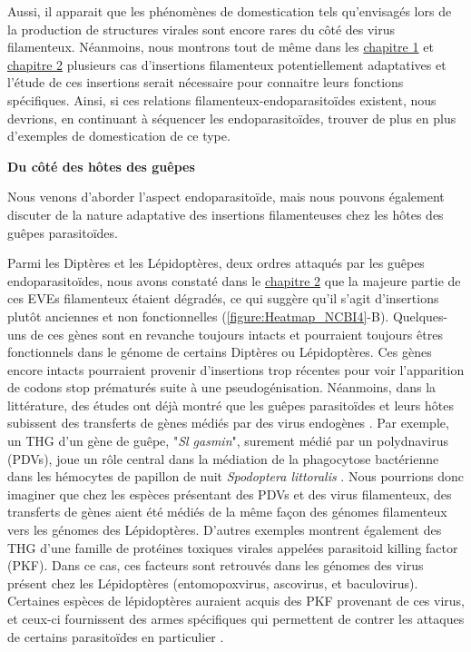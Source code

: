 Aussi, il apparait que les phénomènes de domestication tels qu'envisagés lors de la production de structures virales sont encore rares du côté des virus filamenteux. Néanmoins, nous montrons tout de même dans les \hyperref[sec:chap1]{chapitre 1} et \hyperref[sec:chap2]{chapitre 2} plusieurs cas d'insertions filamenteux potentiellement adaptatives et l'étude de ces insertions serait nécessaire pour connaitre leurs fonctions spécifiques. Ainsi, si ces relations filamenteux-endoparasitoïdes existent, nous devrions, en continuant à séquencer les endoparasitoïdes, trouver de plus en plus d'exemples de domestication de ce type. \\

\newpage

\textbf{Du côté des hôtes des guêpes}

Nous venons d'aborder l'aspect endoparasitoïde, mais nous pouvons également discuter de la nature adaptative des insertions filamenteuses chez les hôtes des guêpes parasitoïdes.

Parmi les Diptères et les Lépidoptères, deux ordres attaqués par les guêpes endoparasitoïdes, nous avons constaté dans le \hyperref[sec:chap2]{chapitre 2} que la majeure partie de ces EVEs filamenteux étaient dégradés, ce qui suggère qu'il s'agit d'insertions plutôt anciennes et non fonctionnelles (\figurename{\ref{figure:Heatmap_NCBI4}}-B). Quelques-uns de ces gènes sont en revanche toujours intacts et pourraient toujours êtres fonctionnels dans le génome de certains Diptères ou Lépidoptères. Ces gènes encore intacts pourraient provenir d'insertions trop récentes pour voir l'apparition de codons stop prématurés suite à une pseudogénisation. Néanmoins, dans la littérature, des études ont déjà montré que les guêpes parasitoïdes et leurs hôtes subissent des transferts de gènes médiés par des virus endogènes \citep{muller_investigating_2022, gasmi_recurrent_2015,di_lelio_evolution_2019}. Par exemple, un THG d'un gène de guêpe, "\textit{Sl gasmin}", surement médié par un polydnavirus (PDVs), joue un rôle central dans la médiation de la phagocytose bactérienne dans les hémocytes de papillon de nuit \textit{Spodoptera littoralis} \citep{di_lelio_evolution_2019}. Nous pourrions donc imaginer que chez les espèces présentant des PDVs et des virus filamenteux, des transferts de gènes aient été médiés de la même façon des génomes filamenteux vers les génomes des Lépidoptères. D'autres exemples montrent également des THG d'une famille de protéines toxiques virales appelées parasitoid killing factor (PKF). Dans ce cas, ces facteurs sont retrouvés dans les génomes des virus présent chez les Lépidoptères (entomopoxvirus, ascovirus, et baculovirus). Certaines espèces de lépidoptères auraient acquis des PKF provenant de ces virus, et ceux-ci fournissent des armes spécifiques qui permettent de contrer les attaques de certains parasitoïdes en particulier \citep{gasmi_horizontally_2021}.\\ 

